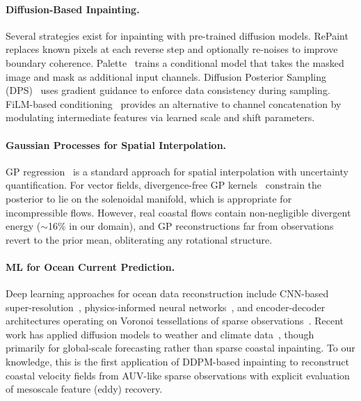 \documentclass{article}
\begin{document}
\paragraph{Diffusion-Based Inpainting.}
Several strategies exist for inpainting with pre-trained diffusion models. RePaint~\citep{lugmayr2022repaint} replaces known pixels at each reverse step and optionally re-noises to improve boundary coherence. Palette~\citep{saharia2022palette} trains a conditional model that takes the masked image and mask as additional input channels. Diffusion Posterior Sampling (DPS)~\citep{chung2022diffusion} uses gradient guidance to enforce data consistency during sampling. FiLM-based conditioning~\citep{perez2018film} provides an alternative to channel concatenation by modulating intermediate features via learned scale and shift parameters.

\paragraph{Gaussian Processes for Spatial Interpolation.}
GP regression~\citep{rasmussen2006gp} is a standard approach for spatial interpolation with uncertainty quantification. For vector fields, divergence-free GP kernels~\citep{macedo2010typing} constrain the posterior to lie on the solenoidal manifold, which is appropriate for incompressible flows. However, real coastal flows contain non-negligible divergent energy ($\sim$16\% in our domain), and GP reconstructions far from observations revert to the prior mean, obliterating any rotational structure.

\paragraph{ML for Ocean Current Prediction.}
Deep learning approaches for ocean data reconstruction include CNN-based super-resolution~\citep{fukami2021machine}, physics-informed neural networks~\citep{raissi2019physics}, and encoder-decoder architectures operating on Voronoi tessellations of sparse observations~\citep{fukami2021global}. Recent work has applied diffusion models to weather and climate data~\citep{price2024gencast, pathak2022fourcastnet, lam2023learning}, though primarily for global-scale forecasting rather than sparse coastal inpainting. To our knowledge, this is the first application of DDPM-based inpainting to reconstruct coastal velocity fields from AUV-like sparse observations with explicit evaluation of mesoscale feature (eddy) recovery.
\end{document}
